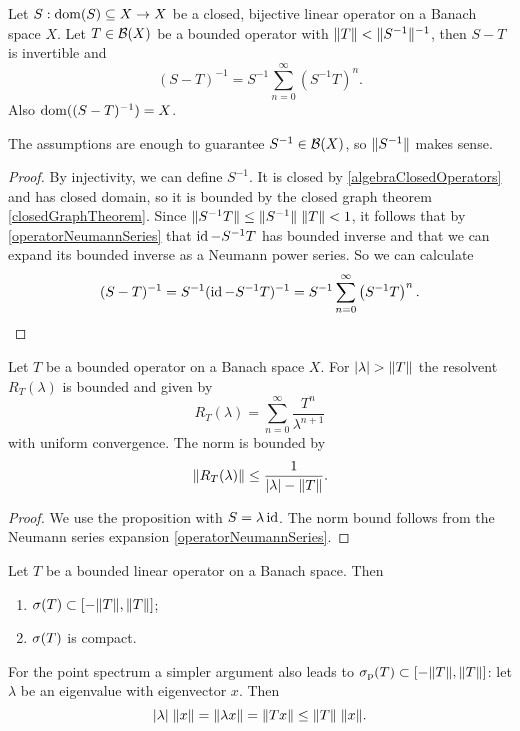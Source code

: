 \begin{proposition} \label{boundedPerturbationClosedOperator}
Let $S: \operatorname{dom}(S)\subseteq X\to X$ be a closed, bijective linear operator on a Banach space $X$. Let $T\in\operatorname{\mathcal{B}}(X)$ be a bounded operator with $\lVert T\rVert < \lVert S^{-1}\rVert^{-1}$, then $S-T$ is invertible and
\[ (S-T)^{-1} = S^{-1}\sum_{n=0}^\infty \left(S^{-1}T\right)^n. \]
Also $\operatorname{dom}((S-T)^{-1}) = X$.
\end{proposition}
The assumptions are enough to guarantee $S^{-1}\in \operatorname{\mathcal{B}}(X)$, so $\lVert S^{-1}\rVert$ makes sense.
\begin{proof}
By injectivity, we can define $S^{-1}$. It is closed by \ref{algebraClosedOperators} and has closed domain, so it is bounded by the closed graph theorem \ref{closedGraphTheorem}. Since $\lVert S^{-1}T\rVert \leq \lVert S^{-1}\rVert\;\lVert T\rVert < 1$, it follows that by \ref{operatorNeumannSeries} that $\operatorname{id} - S^{-1}T$  has bounded inverse and that we can expand its bounded inverse as a Neumann power series. So we can calculate
\[ (S-T)^{-1} = S^{-1}(\operatorname{id} - S^{-1}T)^{-1} = S^{-1}\sum_{n=0}^\infty \left(S^{-1}T\right)^n. \]
\end{proof}
\begin{corollary} \label{secondNeumannSeries}
Let $T$ be a bounded operator on a Banach space $X$. For $|\lambda|>\norm{T}$ the resolvent $R_T(\lambda)$ is bounded and given by
\[ R_T(\lambda) = \sum_{n=0}^\infty\frac{T^n}{\lambda^{n+1}} \]
with uniform convergence. The norm is bounded by
\[ \lVert R_T(\lambda)\rVert \leq \frac{1}{|\lambda|-\lVert T\rVert}. \]
\end{corollary}
\begin{proof}
We use the proposition with $S = \lambda\operatorname{id}$. The norm bound follows from the Neumann series expansion \ref{operatorNeumannSeries}.
\end{proof}
\begin{corollary}
Let $T$ be a bounded linear operator on a Banach space. Then
\begin{enumerate}
\item $\sigma(T)\subset [-\lVert T\rVert, \lVert T\rVert]$;
\item $\sigma(T)$ is compact.
\end{enumerate}
\end{corollary}
For the point spectrum a simpler argument also leads to $\sigma_\text{p}(T)\subset [-\lVert T\rVert, \lVert T\rVert]$: let $\lambda$ be an eigenvalue with eigenvector $x$. Then
\[ |\lambda|\;\lVert x\rVert = \lVert\lambda x\rVert = \lVert Tx\rVert \leq \lVert T\rVert\;\lVert x\rVert. \]


